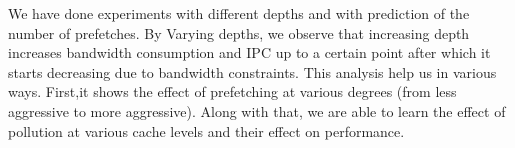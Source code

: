 We have done experiments with different depths and with prediction of the number of prefetches. By
Varying depths, we observe that increasing depth increases bandwidth consumption and IPC up to a certain point
after which it starts decreasing due to bandwidth constraints.
This analysis help us in various ways. First,it shows the effect of prefetching at
various degrees (from less aggressive to more aggressive). Along with that, we are able to learn the effect of pollution at various cache levels and their effect on performance.